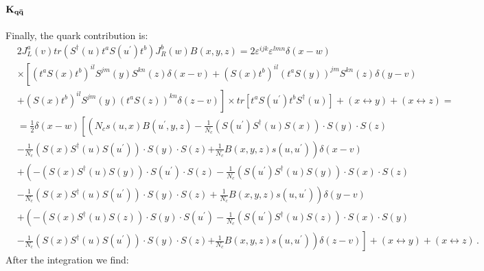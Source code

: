 \documentclass[11pt,a4paper]{article}
\begin{document}
\subsection*{$\bf K_{q\bar{q}}$}
Finally, the quark contribution is: 
\begin{equation}\begin{split}
&2J_{L}^{a}(v)tr\left(S^{\dagger}(u)t^{a}S(u^{\prime})t^{b}\right)J_{R}^{b}(w)B(x,y,z)=
2\varepsilon^{ijk}\varepsilon^{lmn}\delta(x-w)\\
&\times \left[(t^{a}S(x)t^{b})^{il}S^{jm}(y)S^{kn}(z)\delta(x-v)+(S(x)t^{b})^{il}(t^{a}S(y))^{jm}S^{kn}(z)\delta(y-v)\right.\\
&\left.+(S(x)t^{b})^{il}S^{jm}(y)(t^{a}S(z))^{kn}\delta(z-v)\right]\times tr\left[t^{a}S(u^{\prime})t^{b}S^{\dagger}(u)\right]+\left(x\leftrightarrow y\right)+\left(x\leftrightarrow z\right)=\\
&=\frac{1}{2}\delta(x-w)\left[\left(N_{c}s(u,x)B(u^{\prime},y,z)-\frac{1}{N_{c}}(S(u^{\prime})S^{\dagger}(u)S(x))\cdot S(y)\cdot S(z)\right. \right. \\
&-\frac{1}{N_{c}}(S(x)S^{\dagger}(u)S(u^{\prime}))\cdot S(y)\cdot S(z)\left.+\frac{1}{N_{c}}B(x,y,z)s(u,u^{\prime})\right)\delta(x-v)\\
&+\left(-(S(x)S^{\dagger}(u)S(y))\cdot S(u^{\prime})\cdot S(z)-\frac{1}{N_{c}}(S(u^\prime)S^{\dagger}(u)S(y))\cdot S(x)\cdot S(z)\right.\\
&\left.-\frac{1}{N_{c}}(S(x)S^{\dagger}(u)S(u^{\prime}))\cdot S(y)\cdot S(z)+\frac{1}{N_{c}}B(x,y,z)s(u,u^{\prime})\right)\delta(y-v)\\
&+\left(-(S(x)S^{\dagger}(u)S(z))\cdot S(y)\cdot S(u^{\prime})-\frac{1}{N_{c}}(S(u^\prime)S^{\dagger}(u)S(z))\cdot S(x)\cdot S(y)\right.\\
&\left. -\frac{1}{N_{c}}(S(x)S^{\dagger}(u)S(u^{\prime}))\cdot S(y)\cdot S(z) \left.+\frac{1}{N_{c}}B(x,y,z)s(u,u^{\prime})\right)\delta(z-v)\right]+(x\leftrightarrow y)+(x\leftrightarrow z)\,.
\end{split}\end{equation}
After the integration we find:
\end{document}
